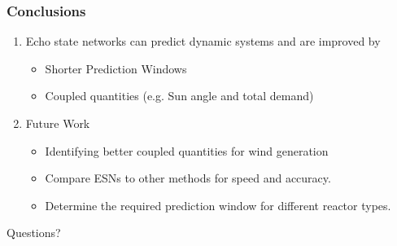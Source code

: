 \begin{frame}
  \frametitle{Conclusions}
  \begin{enumerate}
    \item Echo state networks can predict dynamic systems and are improved by
    \begin{itemize}
      \item Shorter Prediction Windows
      \item Coupled quantities (e.g. Sun angle and total demand)
    \end{itemize}
    \item Future Work
    \begin{itemize}
      \item Identifying better coupled quantities for wind generation
      \item Compare ESNs to other methods for speed and accuracy.
      \item Determine the required prediction window for different reactor types.
    \end{itemize}
  \end{enumerate}
\end{frame}

\begin{frame}
  \centering
  \Huge{Questions?}
\end{frame}
